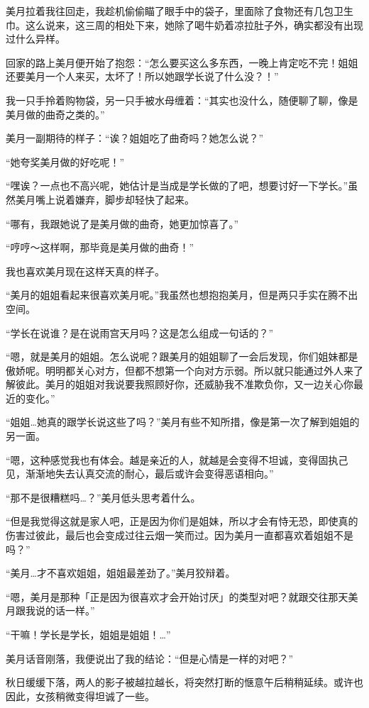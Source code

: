 美月拉着我往回走，我趁机偷偷瞄了眼手中的袋子，里面除了食物还有几包卫生巾。这么说来，这三周的相处下来，她除了喝牛奶着凉拉肚子外，确实都没有出现过什么异样。

回家的路上美月便开始了抱怨：“怎么要买这么多东西，一晚上肯定吃不完！姐姐还要美月一个人来买，太坏了！所以她跟学长说了什么没？！”

我一只手拎着购物袋，另一只手被水母缠着：“其实也没什么，随便聊了聊，像是美月做的曲奇之类的。”

美月一副期待的样子：“诶？姐姐吃了曲奇吗？她怎么说？”

“她夸奖美月做的好吃呢！”

“嘿诶？一点也不高兴呢，她估计是当成是学长做的了吧，想要讨好一下学长。”虽然美月嘴上说着嫌弃，脚步却轻快了起来。

“哪有，我跟她说了是美月做的曲奇，她更加惊喜了。”

“哼哼～这样啊，那毕竟是美月做的曲奇！”

我也喜欢美月现在这样天真的样子。

“美月的姐姐看起来很喜欢美月呢。”我虽然也想抱抱美月，但是两只手实在腾不出空间。

“学长在说谁？是在说雨宫天月吗？这是怎么组成一句话的？”

“嗯，就是美月的姐姐。怎么说呢？跟美月的姐姐聊了一会后发现，你们姐妹都是傲娇呢。明明都关心对方，但都不想第一个向对方示弱。所以就只能通过外人来了解彼此。美月的姐姐对我说要我照顾好你，还威胁我不准欺负你，又一边关心你最近的变化。”

“姐姐…她真的跟学长说这些了吗？”美月有些不知所措，像是第一次了解到姐姐的另一面。

“嗯，这种感觉我也有体会。越是亲近的人，就越是会变得不坦诚，变得固执己见，渐渐地失去认真交流的耐心，最后或许会变得恶语相向。”

“那不是很糟糕吗…？”美月低头思考着什么。

“但是我觉得这就是家人吧，正是因为你们是姐妹，所以才会有恃无恐，即使真的伤害过彼此，最后也会变成过往云烟一笑而过。因为美月一直都喜欢着姐姐不是吗？”

“美月…才不喜欢姐姐，姐姐最差劲了。”美月狡辩着。

“嗯，美月是那种「正是因为很喜欢才会开始讨厌」的类型对吧？就跟交往那天美月跟我说的话一样。”

“干嘛！学长是学长，姐姐是姐姐！…”

美月话音刚落，我便说出了我的结论：“但是心情是一样的对吧？”

秋日缓缓下落，两人的影子被越拉越长，将突然打断的惬意午后稍稍延续。或许也因此，女孩稍微变得坦诚了一些。

